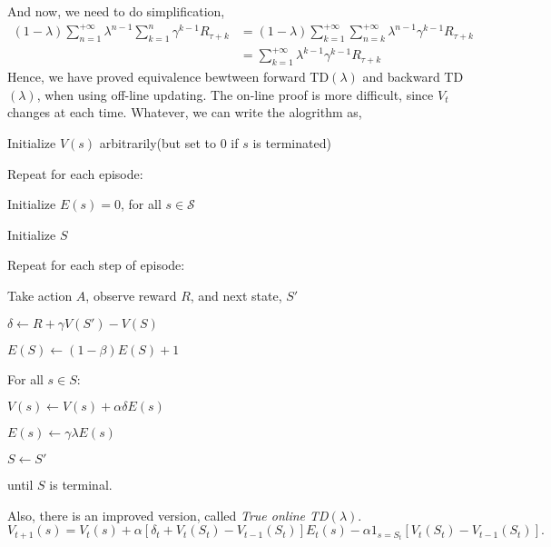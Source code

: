 \documentclass[11pt,a4paper]{article}
\def\S{{\mathcal S}}
\begin{document}
And now, we need to do simplification,
\begin{align}
(1-\lambda)\sum_{n=1}^{+\infty}\lambda^{n-1}\sum_{k=1}^{n}\gamma^{k-1}R_{\tau+k} & = (1-\lambda)\sum_{k=1}^{+\infty}\sum_{n=k}^{+\infty}\lambda^{n-1}\gamma^{k-1}R_{\tau+k} \\ & = \sum_{k=1}^{+\infty}\lambda^{k-1}\gamma^{k-1}R_{\tau+k}
\end{align}
Hence, we have proved equivalence bewtween forward TD$(\lambda)$ and backward TD$(\lambda)$, when using off-line updating. The on-line proof is more difficult, since $V_t$ changes at each time. Whatever, we can write the alogrithm as,
\begin{tcolorbox}
Initialize $V(s)$ arbitrarily(but set to $0$ if $s$ is terminated)\par 
Repeat for each episode: \par 
\hspace{1cm} Initialize $E(s) = 0$, for all $s \in \S$ \par 
\hspace{1cm} Initialize $S$ \par 
\hspace{1cm} Repeat for each step of episode:\par 
\hspace{2cm} Take action $A$, observe reward $R$, and next state, $S'$\par 
\hspace{2cm} $\delta \leftarrow R + \gamma V(S') - V(S)$ \par 
\hspace{2cm} $E(S) \leftarrow (1-\beta)E(S) + 1$\par 
\hspace{2cm} For all $s \in S$: \par 
\hspace{3cm} $V(s) \leftarrow V(s) + \alpha \delta E(s)$ \par
\hspace{3cm} $E(s) \leftarrow \gamma \lambda E(s)$\par
\hspace{2cm} $S \leftarrow S'$\par 
\hspace{1cm} until $S$ is terminal.
\end{tcolorbox}
Also, there is an improved version, called \emph{True online TD$(\lambda)$}.
\begin{equation}
V_{t+1}(s) = V_t(s) + \alpha[\delta_t + V_t(S_t) - V_{t-1}(S_t)]E_t(s) - \alpha 1_{s=S_t}[V_t(S_t)-V_{t-1}(S_t)].
\end{equation}
\end{document}

